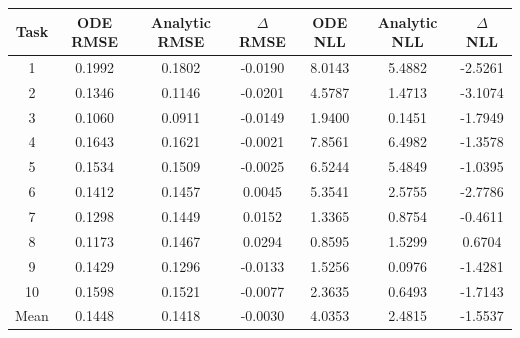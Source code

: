 \documentclass{article}
\theoremstyle{plain}
\theoremstyle{definition}
\theoremstyle{remark}
\begin{document}
\begin{center}
\begin{minipage}{0.95\linewidth}
  \captionsetup{hypcap=false}
  \label{tab:solar-taskwise}
  \centering
  \begin{small}
    \begin{tabular}{ccccccc}
      \toprule
      Task & ODE RMSE & Analytic RMSE & $\Delta$ RMSE & ODE NLL & Analytic NLL & $\Delta$ NLL \\
      \midrule
      1  & 0.1992 & 0.1802 & -0.0190 & 8.0143 & 5.4882 & -2.5261 \\
      2  & 0.1346 & 0.1146 & -0.0201 & 4.5787 & 1.4713 & -3.1074 \\
      3  & 0.1060 & 0.0911 & -0.0149 & 1.9400 & 0.1451 & -1.7949 \\
      4  & 0.1643 & 0.1621 & -0.0021 & 7.8561 & 6.4982 & -1.3578 \\
      5  & 0.1534 & 0.1509 & -0.0025 & 6.5244 & 5.4849 & -1.0395 \\
      6  & 0.1412 & 0.1457 &  0.0045 & 5.3541 & 2.5755 & -2.7786 \\
      7  & 0.1298 & 0.1449 &  0.0152 & 1.3365 & 0.8754 & -0.4611 \\
      8  & 0.1173 & 0.1467 &  0.0294 & 0.8595 & 1.5299 &  0.6704 \\
      9  & 0.1429 & 0.1296 & -0.0133 & 1.5256 & 0.0976 & -1.4281 \\
      10 & 0.1598 & 0.1521 & -0.0077 & 2.3635 & 0.6493 & -1.7143 \\
      \midrule
      Mean & 0.1448 & 0.1418 & -0.0030 & 4.0353 & 2.4815 & -1.5537 \\
      \bottomrule
    \end{tabular}
  \end{small}
\end{minipage}
\end{center}

\clearpage
\end{document}
